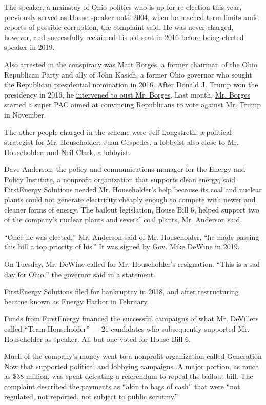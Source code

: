 The speaker, a mainstay of Ohio politics who is up for re-election this
year, previously served as House speaker until 2004, when he reached
term limits amid reports of possible corruption, the complaint said. He
was never charged, however, and successfully reclaimed his old seat in
2016 before being elected speaker in 2019.

Also arrested in the conspiracy was Matt Borges, a former chairman of
the Ohio Republican Party and ally of John Kasich, a former Ohio
governor who sought the Republican presidential nomination in 2016.
After Donald J. Trump won the presidency in 2016, he
\href{https://www.nytimes3xbfgragh.onion/2017/01/06/us/politics/donald-trump-transition.html}{intervened
to oust Mr. Borges}. Last month, \href{https://rightsidepac.com/}{Mr.
Borges started a super PAC} aimed at convincing Republicans to vote
against Mr. Trump in November.

The other people charged in the scheme were Jeff Longstreth, a political
strategist for Mr. Householder; Juan Cespedes, a lobbyist also close to
Mr. Householder; and Neil Clark, a lobbyist.

Dave Anderson, the policy and communications manager for the Energy and
Policy Institute, a nonprofit organization that supports clean energy,
said FirstEnergy Solutions needed Mr. Householder's help because its
coal and nuclear plants could not generate electricity cheaply enough to
compete with newer and cleaner forms of energy. The bailout legislation,
House Bill 6, helped support two of the company's nuclear plants and
several coal plants, Mr. Anderson said.

``Once he was elected,'' Mr. Anderson said of Mr. Householder, ``he made
passing this bill a top priority of his.'' It was signed by Gov. Mike
DeWine in 2019.

On Tuesday, Mr. DeWine called for Mr. Householder's resignation. ``This
is a sad day for Ohio,'' the governor said in a statement.

FirstEnergy Solutions filed for bankruptcy in 2018, and after
restructuring became known as Energy Harbor in February.

Funds from FirstEnergy financed the successful campaigns of what Mr.
DeVillers called ``Team Householder'' --- 21 candidates who subsequently
supported Mr. Householder as speaker. All but one voted for House Bill
6.

Much of the company's money went to a nonprofit organization called
Generation Now that supported political and lobbying campaigns. A major
portion, as much as \$38 million, was spent defeating a referendum to
repeal the bailout bill. The complaint described the payments as ``akin
to bags of cash'' that were ``not regulated, not reported, not subject
to public scrutiny.''

